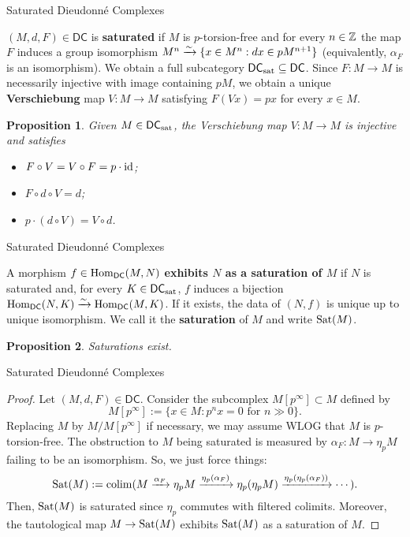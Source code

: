 \documentclass[aspectratio=1610]{beamer}
\newcommand{\DC}{\mathsf{DC}}
\newcommand{\sat}{\textup{sat}}
\newcommand{\Sat}{\textup{Sat}}
\newtheorem{proposition}{Proposition}
\begin{document}
\begin{frame}{Saturated Dieudonn\'{e} Complexes}
\begin{definition}
$(M,d,F)\in\DC$ is \textbf{saturated} if $M$ is $p$-torsion-free and for every $n\in\mathbb{Z}$ the map $F$ induces a group isomorphism $M^n\xrightarrow{\sim}\{x\in M^n : dx\in pM^{n+1}\}$ (equivalently, $\alpha_F$ is an isomorphism). We obtain a full subcategory $\DC_{\sat}\subset\DC$. Since $F: M\to M$ is necessarily injective with image containing $pM$, we obtain a unique \textbf{Verschiebung} map $V: M\to M$ satisfying $F(Vx)=px$ for every $x\in M$.
\end{definition}

\begin{proposition}
Given $M\in\DC_{\sat}$, the Verschiebung map $V: M\to M$ is injective and satisfies
\begin{itemize}
\item $F\circ V=V\circ F=p\cdot\operatorname{id}$;

\item $F\circ d\circ V=d$;

\item $p\cdot(d\circ V)=V\circ d$.
\end{itemize}
\end{proposition}
\end{frame}

\begin{frame}{Saturated Dieudonn\'{e} Complexes}
\begin{definition}
A morphism $f\in\Hom_{\DC}(M,N)$ \textbf{exhibits $N$ as a saturation of $M$} if $N$ is saturated and, for every $K\in\DC_{\sat}$, $f$ induces a bijection $\Hom_{\DC}(N,K)\xto{\sim}\Hom_{\DC}(M,K)$. If it exists, the data of $(N,f)$ is unique up to unique isomorphism. We call it the \textbf{saturation} of $M$ and write $\Sat(M)$.
\end{definition}

\begin{proposition}
Saturations exist. 
\end{proposition}
\end{frame}

\begin{frame}{Saturated Dieudonn\'{e} Complexes}
\begin{proof}
Let $(M,d,F)\in\DC$. Consider the subcomplex $M[p^{\infty}]\subset M$ defined by 
$$M[p^{\infty}]:=\{x\in M : p^nx=0\textrm{ for }n\gg0\}.$$
Replacing $M$ by $M/M[p^{\infty}]$ if necessary, we may assume WLOG that $M$ is $p$-torsion-free. The obstruction to $M$ being saturated is measured by $\alpha_F: M\to\eta_pM$ failing to be an isomorphism. So, we just force things:
$$\Sat(M):=\colim(M\xto{\alpha_F}\eta_pM\xto{\eta_p(\alpha_F)}\eta_p(\eta_pM)\xto{\eta_p(\eta_p(\alpha_F))}\cdots).$$
Then, $\Sat(M)$ is saturated since $\eta_p$ commutes with filtered colimits. Moreover, the tautological map $M\to\Sat(M)$ exhibits $\Sat(M)$ as a saturation of $M$.
\end{proof}
\end{frame}
\end{document}
